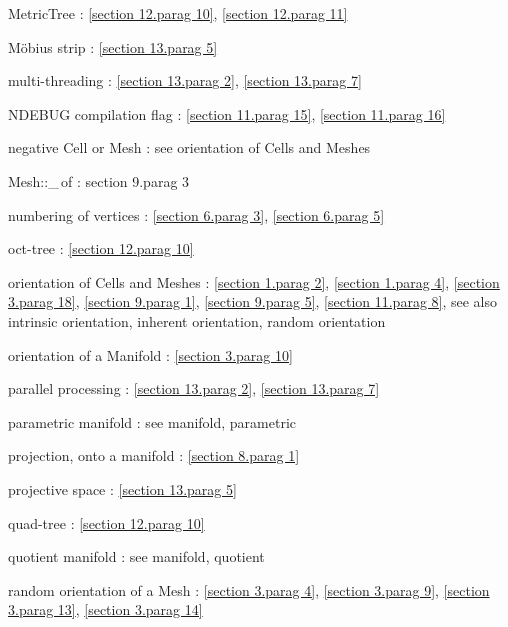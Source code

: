 \documentclass[a4paper]{scrreprt}
\def\numb{}
\newcommand\verm[1]{\textcolor{manif}{#1}}
\renewcommand\tt{\normalfont\ttfamily}
\begin{document}
\noindent
{\small\tt \verm{MetricTree}} : \ref{\numb section 12.\numb parag 10},
\ref{\numb section 12.\numb parag 11}

\noindent
M\"obius strip : \ref{\numb section 13.\numb parag 5}

\noindent
multi-threading : \ref{\numb section 13.\numb parag 2}, \ref{\numb section 13.\numb parag 7}

\noindent
{\small\tt NDEBUG} compilation flag : \ref{\numb section 11.\numb parag 15},
\ref{\numb section 11.\numb parag 16}

\noindent
negative {\small\tt \verm{Cell}} or {\small\tt \verm{Mesh}} :
see orientation of {\small\tt \verm{Cell}}s and {\small\tt \verm{Mesh}}es

\noindent
{\small\tt\verm{Mesh}::\_\,of} : {\numb section 9.\numb parag 3}

\noindent
numbering of vertices :
\ref{\numb section 6.\numb parag 3}, \ref{\numb section 6.\numb parag 5}

\noindent
oct-tree : \ref{\numb section 12.\numb parag 10}

\noindent
orientation of {\small\tt \verm{Cell}}s and {\small\tt \verm{Mesh}}es :
\ref{\numb section 1.\numb parag 2}, \ref{\numb section 1.\numb parag 4},
\ref{\numb section 3.\numb parag 18}, \ref{\numb section 9.\numb parag 1},
\ref{\numb section 9.\numb parag 5}, \ref{\numb section 11.\numb parag 8},\hfil\break
\hglue 9mm see also intrinsic orientation, inherent orientation, random orientation

\noindent
orientation of a {\small\tt \verm{Manifold}} : \ref{\numb section 3.\numb parag 10}

\noindent
parallel processing : \ref{\numb section 13.\numb parag 2}, \ref{\numb section 13.\numb parag 7}

\noindent
parametric manifold : see manifold, parametric

\noindent
projection, onto a manifold :
\ref{\numb section 8.\numb parag 1}

\noindent
projective space : \ref{\numb section 13.\numb parag 5}

\noindent
quad-tree : \ref{\numb section 12.\numb parag 10}

\noindent
quotient manifold : see manifold, quotient

\noindent
random orientation of a {\small\tt\verm{Mesh}} : \ref{\numb section 3.\numb parag 4},
\ref{\numb section 3.\numb parag 9}, \ref{\numb section 3.\numb parag 13},
\ref{\numb section 3.\numb parag 14}
\end{document}
